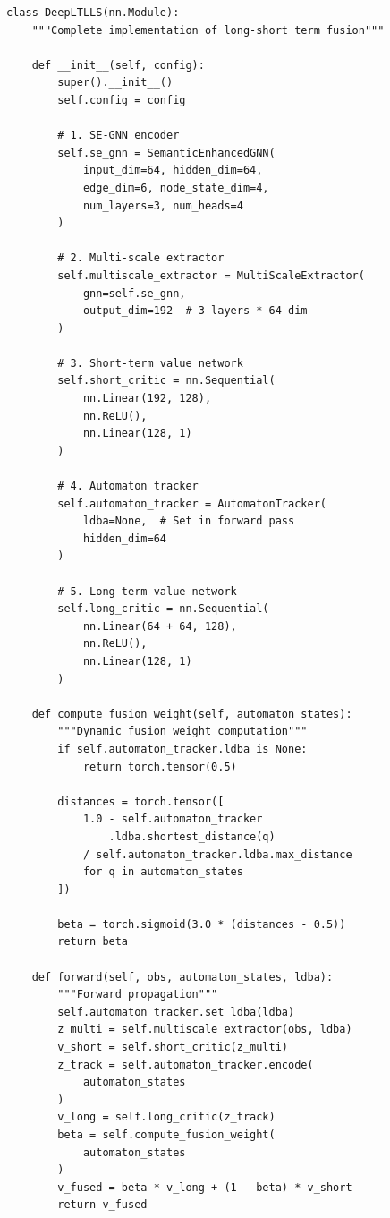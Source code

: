 \documentclass[conference]{IEEEtran}
\begin{document}
\begin{lstlisting}
class DeepLTLLS(nn.Module):
    """Complete implementation of long-short term fusion"""
    
    def __init__(self, config):
        super().__init__()
        self.config = config
        
        # 1. SE-GNN encoder
        self.se_gnn = SemanticEnhancedGNN(
            input_dim=64, hidden_dim=64,
            edge_dim=6, node_state_dim=4,
            num_layers=3, num_heads=4
        )
        
        # 2. Multi-scale extractor
        self.multiscale_extractor = MultiScaleExtractor(
            gnn=self.se_gnn,
            output_dim=192  # 3 layers * 64 dim
        )
        
        # 3. Short-term value network
        self.short_critic = nn.Sequential(
            nn.Linear(192, 128),
            nn.ReLU(),
            nn.Linear(128, 1)
        )
        
        # 4. Automaton tracker
        self.automaton_tracker = AutomatonTracker(
            ldba=None,  # Set in forward pass
            hidden_dim=64
        )
        
        # 5. Long-term value network
        self.long_critic = nn.Sequential(
            nn.Linear(64 + 64, 128),
            nn.ReLU(),
            nn.Linear(128, 1)
        )
    
    def compute_fusion_weight(self, automaton_states):
        """Dynamic fusion weight computation"""
        if self.automaton_tracker.ldba is None:
            return torch.tensor(0.5)
        
        distances = torch.tensor([
            1.0 - self.automaton_tracker
                .ldba.shortest_distance(q) 
            / self.automaton_tracker.ldba.max_distance
            for q in automaton_states
        ])
        
        beta = torch.sigmoid(3.0 * (distances - 0.5))
        return beta
    
    def forward(self, obs, automaton_states, ldba):
        """Forward propagation"""
        self.automaton_tracker.set_ldba(ldba)
        z_multi = self.multiscale_extractor(obs, ldba)
        v_short = self.short_critic(z_multi)
        z_track = self.automaton_tracker.encode(
            automaton_states
        )
        v_long = self.long_critic(z_track)
        beta = self.compute_fusion_weight(
            automaton_states
        )
        v_fused = beta * v_long + (1 - beta) * v_short
        return v_fused
\end{lstlisting}
\end{document}

